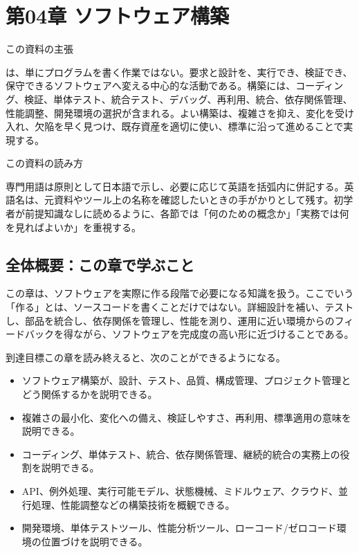 \documentclass[a4paper,11pt]{ltjsarticle}
\numberwithin{figure}{section}
\numberwithin{table}{section}
\begin{document}
\section{第04章 ソフトウェア構築}
\noindent この資料の主張

は、単にプログラムを書く作業ではない。要求と設計を、実行でき、検証でき、保守できるソフトウェアへ変える中心的な活動である。構築には、コーディング、検証、単体テスト、統合テスト、デバッグ、再利用、統合、依存関係管理、性能調整、開発環境の選択が含まれる。よい構築は、複雑さを抑え、変化を受け入れ、欠陥を早く見つけ、既存資産を適切に使い、標準に沿って進めることで実現する。

\begin{plainbox}
この資料の読み方

専門用語は原則として日本語で示し、必要に応じて英語を括弧内に併記する。英語名は、元資料やツール上の名称を確認したいときの手がかりとして残す。初学者が前提知識なしに読めるように、各節では「何のための概念か」「実務では何を見ればよいか」を重視する。
\end{plainbox}



\subsection*{全体概要：この章で学ぶこと}

この章は、ソフトウェアを実際に作る段階で必要になる知識を扱う。ここでいう「作る」とは、ソースコードを書くことだけではない。詳細設計を補い、テストし、部品を統合し、依存関係を管理し、性能を測り、運用に近い環境からのフィードバックを得ながら、ソフトウェアを完成度の高い形に近づけることである。

\noindent 到達目標\quad この章を読み終えると、次のことができるようになる。

\begin{itemize}
  \item ソフトウェア構築が、設計、テスト、品質、構成管理、プロジェクト管理とどう関係するかを説明できる。
  \item 複雑さの最小化、変化への備え、検証しやすさ、再利用、標準適用の意味を説明できる。
  \item コーディング、単体テスト、統合、依存関係管理、継続的統合の実務上の役割を説明できる。
  \item API、例外処理、実行可能モデル、状態機械、ミドルウェア、クラウド、並行処理、性能調整などの構築技術を概観できる。
  \item 開発環境、単体テストツール、性能分析ツール、ローコード/ゼロコード環境の位置づけを説明できる。
\end{itemize}
\end{document}
